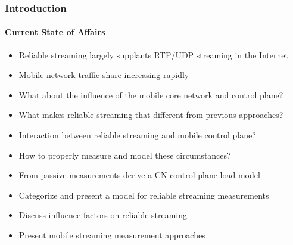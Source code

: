 \documentclass{beamer}
\begin{document}
\begin{frame}
	\frametitle{Introduction}
	\framesubtitle{Current State of Affairs}

	\begin{itemize}
		\item Reliable streaming largely supplants RTP/UDP streaming in the Internet
		\item Mobile network traffic share increasing rapidly
		\item What about the influence of the mobile core network and control plane?
		\item What makes reliable streaming that different from previous approaches?
		\item Interaction between reliable streaming and mobile control plane?
		\item How to properly measure and model these circumstances?
	\end{itemize}

	\begin{itemize}[<2->]
		\item From passive measurements derive a CN control plane load model
		\item Categorize and present a model for reliable streaming measurements
		\item Discuss influence factors on reliable streaming
		\item Present mobile streaming measurement approaches
	\end{itemize}
\end{frame}
\end{document}

